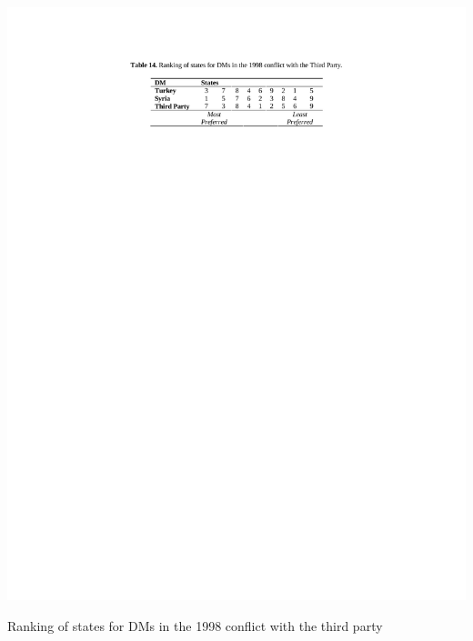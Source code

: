 \documentclass[letterpaper,12pt,titlepage,oneside,final]{book}
\begin{document}
\begin{table}[H]
\centering
\includegraphics[scale=1]{PDF-IMG/tables/14.pdf}

\caption{Ranking of states for DMs in the 1998 conflict with the third party}

\label{tbl:t14}
\end{table}
\end{document}
